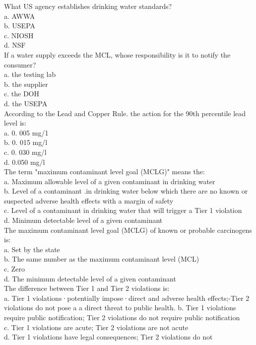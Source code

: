 What US agency establishes drinking water standards?\\
a.	AWWA\\
b.	USEPA\\
c.	NIOSH\\
d.	NSF\\

If a water supply exceeds the MCL, whose responsibility is it to notify the consumer?\\
a.	the testing lab\\
b. 	the supplier\\
c.	the DOH\\
d.	the USEPA\\

According to the Lead and Copper Rule. the action for the 90th percentile lead level is:\\
a.	0. 005 mg/1\\
b.	0. 015 mg/l\\
c.	0. 030 mg/l\\
d.	0.050 mg/l\\


The term "maximum contaminant level goal (MCLG)" means the:\\ 
a. Maximum allowable level of a given contaminant in drinking water\\
b. Level of a contaminant .in drinking water below which there are no known or suspected adverse health effects with a margin of safety\\
c. Level of a contaminant in drinking water that will trigger a Tier 1 violation\\
d. Minimum detectable level of a given contaminant\\

The maximum contaminant level goal (MCLG) of known or probable carcinogens is:\\
a. Set by the state\\
b. The same number as the maximum contaminant level (MCL)\\
c. Zero\\
d. The minimum detectable level of a given contaminant\\

The difference between Tier 1 and Tier 2 violations is:\\
a. Tier 1 violations·potentially impose·direct and adverse health effects;-Tier 2 violations do not pose a a direct threat to public health.
b. Tier 1 violations require public notification; Tier 2 violations do not require public notification\\
c. Tier 1 violations are acute; Tier 2 violations are not acute\\
d. Tier 1 violations have legal consequences; Tier 2 violations do not\\

